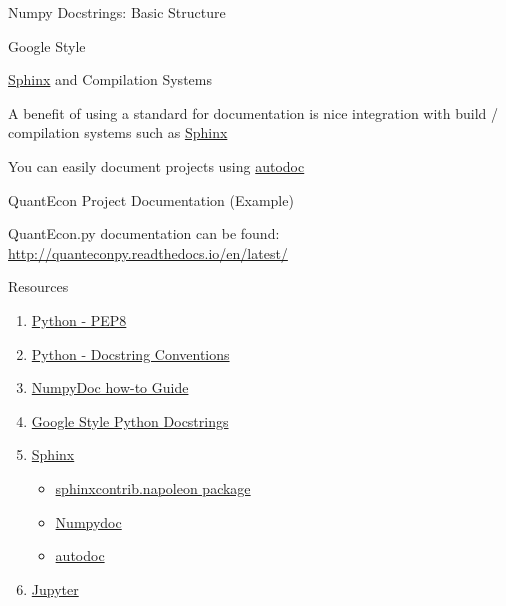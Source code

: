 \documentclass{beamer}
\begin{document}
\begin{frame}{Numpy Docstrings: Basic Structure}



\end{frame}

\begin{frame}{Google Style}

\end{frame}


\begin{frame}{\href{http://www.sphinx-doc.org/en/stable/}{Sphinx} and Compilation Systems}

A benefit of using a standard for documentation is nice integration with build / compilation systems such as \href{http://www.sphinx-doc.org/en/stable/}{Sphinx}

You can easily document projects using \href{http://www.sphinx-doc.org/en/stable/ext/autodoc.html}{autodoc}

\end{frame}

\begin{frame}{QuantEcon Project Documentation (Example)}

QuantEcon.py documentation can be found: \url{http://quanteconpy.readthedocs.io/en/latest/}

\end{frame}

\begin{frame}{Resources}
\begin{enumerate}
\item \href{https://www.python.org/dev/peps/pep-0008/}{Python - PEP8}
\item \href{https://www.python.org/dev/peps/pep-0257/}{Python - Docstring Conventions}
\item \href{https://github.com/numpy/numpy/blob/master/doc/HOWTO_DOCUMENT.rst.txt}{NumpyDoc how-to Guide}
\item \href{http://sphinxcontrib-napoleon.readthedocs.io/en/latest/example_google.html}{Google Style Python Docstrings}
\item \href{http://www.sphinx-doc.org/en/stable/}{Sphinx}
\begin{itemize}
  \item \href{http://sphinxcontrib-napoleon.readthedocs.io/en/latest/sphinxcontrib.napoleon.html}{sphinxcontrib.napoleon package}
  \item \href{https://github.com/numpy/numpydoc}{Numpydoc}
  \item \href{http://www.sphinx-doc.org/en/stable/ext/autodoc.html}{autodoc}
\end{itemize}
\item \href{http://jupyter.org/}{Jupyter}
\end{enumerate}
\end{frame}
\end{document}
